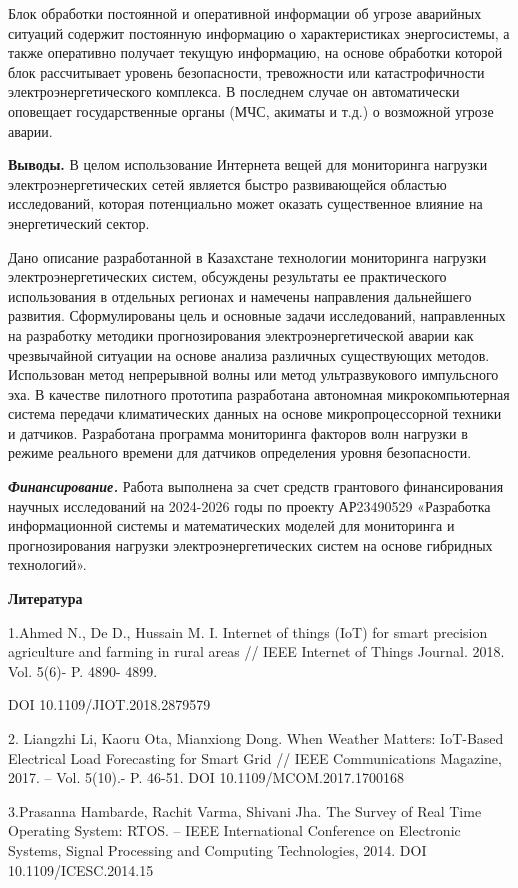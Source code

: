 Блок обработки постоянной и оперативной информации об угрозе аварийных
ситуаций содержит постоянную информацию о характеристиках энергосистемы,
а также оперативно получает текущую информацию, на основе обработки
которой блок рассчитывает уровень безопасности, тревожности или
катастрофичности электроэнергетического комплекса. В последнем случае он
автоматически оповещает государственные органы (МЧС, акиматы и т.д.) о
возможной угрозе аварии.

{\bfseries Выводы.} В целом использование Интернета вещей для мониторинга
нагрузки электроэнергетических сетей является быстро развивающейся
областью исследований, которая потенциально может оказать существенное
влияние на энергетический сектор.

Дано описание разработанной в Казахстане технологии мониторинга нагрузки
электроэнергетических систем, обсуждены результаты ее практического
использования в отдельных регионах и намечены направления дальнейшего
развития. Сформулированы цель и основные задачи исследований,
направленных на разработку методики прогнозирования
электроэнергетической аварии как чрезвычайной ситуации на основе анализа
различных существующих методов. Использован метод непрерывной волны или
метод ультразвукового импульсного эха. В качестве пилотного прототипа
разработана автономная микрокомпьютерная система передачи климатических
данных на основе микропроцессорной техники и датчиков. Разработана
программа мониторинга факторов волн нагрузки в режиме реального времени
для датчиков определения уровня безопасности.

\emph{{\bfseries Финансирование.}} Работа выполнена за счет средств
грантового финансирования научных исследований на 2024-2026 годы по
проекту АР23490529 «Разработка информационной системы и математических
моделей для мониторинга и прогнозирования нагрузки электроэнергетических
систем на основе гибридных технологий».

{\bfseries Литература}

1.Ahmed N., De D., Hussain M. I. Internet of things (IoT) for smart
precision agriculture and farming in rural areas // IEEE Internet of
Things Journal. 2018. Vol. 5(6)- P. 4890- 4899.

DOI 10.1109/JIOT.2018.2879579

2. Liangzhi Li, Kaoru Ota, Mianxiong Dong. When Weather Matters:
IoT-Based Electrical Load Forecasting for Smart Grid // IEEE
Communications Magazine, 2017. -- Vol. 5(10).- P. 46-51. DOI
10.1109/MCOM.2017.1700168

3.Prasanna Hambarde, Rachit Varma, Shivani Jha. The Survey of Real Time
Operating System: RTOS. -- IEEE International Conference on Electronic
Systems, Signal Processing and Computing Technologies, 2014. DOI
10.1109/ICESC.2014.15

